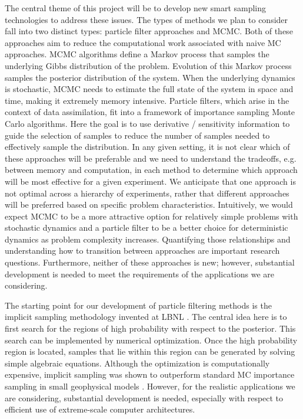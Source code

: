 \documentclass[11pt]{article}
\newcommand{\MarginPar}[1]{\marginpar{%
\vskip-\baselineskip %
\raggedright\tiny\sffamily
\hrule\smallskip{\color{red}#1}\par\smallskip\hrule}}
\begin{document}
The central theme of this project will be to develop new smart sampling technologies 
to address these issues.
The types of methods we plan to consider fall into two distinct types:  particle filter approaches
and MCMC.
Both of these approaches aim to reduce the computational work associated with naive MC approaches.
MCMC algorithms define a Markov
process that samples the underlying Gibbs distribution of the problem. 
Evolution of this Markov process
samples the posterior distribution of the system.
When the underlying dynamics is stochastic, MCMC needs to estimate
\MarginPar{JBB:  is this correct? Jonathan?}
the full state of the system in space and time, making it extremely memory intensive.
Particle filters, which arise in the context of data assimilation,
fit into a framework of importance sampling Monte Carlo algorithms.  Here the goal is to use
derivative / sensitivity information to guide the selection of samples to reduce the number of samples
needed to effectively sample the distribution.
In any given setting, it is not clear which of these approaches will be preferable and
we need to understand the tradeoffs, e.g. between memory and computation, in each method to determine which approach will be most effective for a given experiment. We anticipate that one approach is not optimal across a hierarchy of experiments, rather
that different approaches will be preferred based on specific problem characteristics. Intuitively,
we would expect MCMC to be a more attractive option for relatively simple problems with stochastic dynamics and a particle
filter to be a better choice for deterministic dynamics as problem complexity increases. Quantifying those relationships
and understanding how to transition between approaches are important research questions.
Furthermore, neither of these approaches is new; however, substantial development is needed to meet the requirements
of the applications we are considering.

The starting point for our development of particle filtering methods is the implicit sampling methodology invented at LBNL \cite{chorintupnas,chorin2010,Morzfeld2011,Morzfeld2012,Atkins2013}.
The central idea here is to first search for the regions of high probability with respect to the posterior.
This search can be implemented by numerical optimization.
Once the high probability region is located, samples that lie within this region can be generated by solving simple algebraic equations.
Although the optimization is computationally expensive, implicit sampling was shown to outperform standard MC importance sampling in small geophysical models \cite{Morzfeld2011,Morzfeld2012,Atkins2013}. 
However, for the realistic applications we are considering, substantial development is needed, especially with respect to efficient use of extreme-scale computer architectures. 
\end{document}

